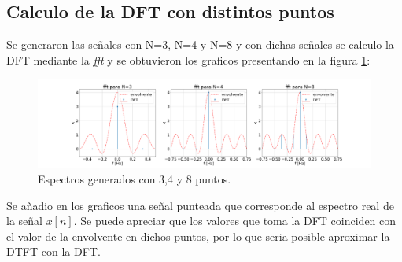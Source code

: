 \documentclass[letterpaper]{article}
\begin{document}
    \subsection{Calculo de la DFT con distintos puntos}    
    Se generaron las señales con N=3, N=4 y N=8 y con dichas señales se calculo la DFT mediante la \textit{fft} y se obtuvieron los graficos presentando en la figura \ref{fig.3b}:

    \begin{figure}[htb]
    \centering
    \includegraphics[width=\textwidth]{Img/punto_3_b.png}
    \caption{Espectros generados con 3,4 y 8 puntos.}
    \label{fig.3b}
    \end{figure}

    Se añadio en los graficos una señal punteada que corresponde al espectro real de la señal $x[n]$.
    Se puede apreciar que los valores que toma la DFT coinciden con el valor de la envolvente en dichos puntos, por lo que seria posible aproximar la DTFT con la DFT.
\end{document}

